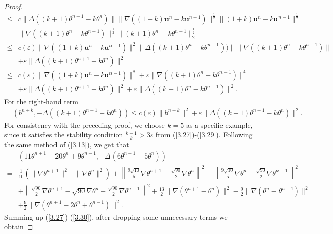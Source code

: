 \documentclass[10pt,a4paper]{amsart}
\theoremstyle{thmm}
\begin{document}
\begin{proof}
{\begin{align}
			\leq & c\|\Delta((k+1)\theta^{n+1}-k\theta^n)\|\|\nabla((1+k)\bm{u}^n-k\bm{u}^{n-1})\|^{\frac{1}{2}}\|(1+k)\bm{u}^n-k\bm{u}^{n-1}\|^\frac{1}{2}\nonumber\\
			&  \|\nabla((k+1)\theta^{n} - k\theta^{n-1})\|^\frac{1}{2}\|(k+1)\theta^{n} - k\theta^{n-1}\|^\frac{1}{2}_2\nonumber\\
			\leq & c(\varepsilon)\|\nabla((1+k)\bm{u}^n-k\bm{u}^{n-1})\|^2\|\Delta((k+1)\theta^{n} - k\theta^{n-1}))\|\|\nabla((k+1)\theta^{n} - k\theta^{n-1})\|\nonumber\\
			&  +\varepsilon\|\Delta((k+1)\theta^{n+1}-k\theta^n)\|^2\nonumber\\
			\leq & c(\varepsilon)\|\nabla((1+k)\bm{u}^n-k\bm{u}^{n-1})\|^8+\varepsilon\|\nabla((k+1)\theta^{n} - k\theta^{n-1})\|^4\nonumber\\
			&  +\varepsilon\|\Delta((k+1)\theta^{n+1}-k\theta^n)\|^2+\varepsilon\|\Delta((k+1)\theta^{n} - k\theta^{n-1})\|^2.
		\end{align}}
		For the right-hand term
		\begin{align}\label{3.29}
			&(b^{n+k},-\Delta((k+1)\theta^{n+1}-k\theta^n))\leq c(\varepsilon)\|b^{n+k}\|^2+\varepsilon\|\Delta((k+1)\theta^{n+1}-k\theta^n)\|^2.
		\end{align}
		For consistency with the preceding proof, we choose \(k = 5\) as a specific example, since it satisfies the stability condition \(\frac{k-1}{k} > 3\varepsilon\)  from (\ref{3.27})-(\ref{3.29}).  Following the same method of  (\ref{3.13}), we get that
		\begin{align}\label{3.30}
			&(11\theta^{n+1} - 20\theta^n + 9\theta^{n-1}, -\Delta(6\theta^{n+1} - 5\theta^n)) \nonumber\\
			=& \frac{1}{10} \left( \|\nabla \theta^{n+1}\|^2 - \|\nabla \theta^n\|^2 \right) + \left\| \frac{9\sqrt{10}}{5} \nabla \theta^{n+1} - \frac{\sqrt{90}}{2} \nabla \theta^n \right\|^2 - \left\| \frac{9\sqrt{10}}{5} \nabla \theta^n - \frac{\sqrt{90}}{2} \nabla \theta^{n-1} \right\|^2 	\nonumber\\
			&  + \left\| \frac{\sqrt{90}}{2} \nabla \theta^{n+1} - \sqrt{90} \nabla \theta^n + \frac{\sqrt{90}}{2} \nabla \theta^{n-1} \right\|^2 + \frac{13}{2} \|\nabla(\theta^{n+1} - \theta^n)\|^2 - \frac{9}{2} \|\nabla(\theta^n - \theta^{n-1})\|^2\nonumber\\	
			&   + \frac{9}{2} \|\nabla(\theta^{n+1} - 2\theta^n + \theta^{n-1})\|^2.
		\end{align}
		Summing up (\ref{3.27})-(\ref{3.30}), after dropping some unnecessary terms we obtain

\end{proof}
\end{document}
